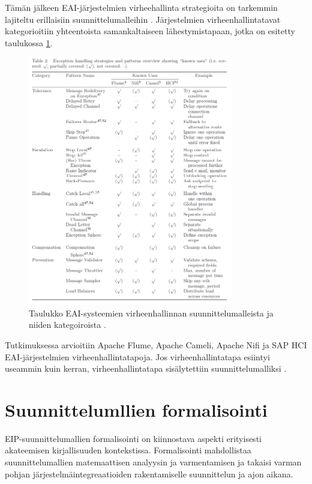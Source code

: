 Tämän jälkeen EAI-järjestelmien virheehallinta strategioita on tarkemmin lajiteltu erillaisiin suunnittelumalleihin \citep{ExceptionRitter2016}. Järjestelmien virheenhallintatavat kategorioitiin yhteentoista samankaltaiseen lähestymistapaan, jotka on esitetty taulukossa \ref{fig:exceptionritter}.


\begin{figure}[h]
\begin{center}
\includegraphics[width=0.8\textwidth]{kuvat/ritter_expetions.png}
\caption{Taulukko EAI-systeemien virheenhallinnan suunnittelumalleista ja niiden kategoiroista \citep{ExceptionRitter2016}.\label{fig:exceptionritter}}
\end{center}
\end{figure}


Tutkimuksessa arvioitiin Apache Flume, Apache Cameli, Apache Nifi ja SAP HCI EAI-järjestelmien virheenhallintatapoja. Jos virheenhallintatapa esiintyi useammin kuin kerran, virheenhallintatapa sisälytettiin suunnittelumalliksi \citep{ExceptionRitter2016}.



\section{Suunnittelumllien formalisointi}
EIP-suunnittelumallien formalisointi on kiinnostava aspekti erityisesti akateemisen kirjallisuuden kontekstissa. Formalisointi mahdollistaa suunnittelumallien matemaattisen analyysin ja varmentamisen ja takaisi varman pohjan järjestelmäintegreaatioiden rakentamiselle suunnittelun ja ajon aikana.

